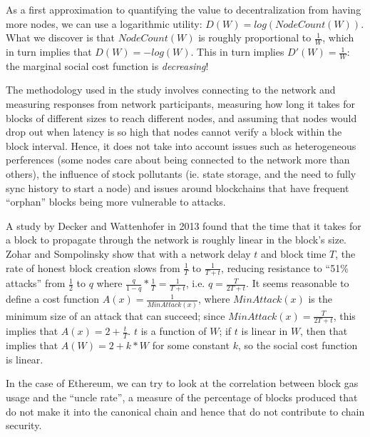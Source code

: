 \documentclass[12pt, final]{article}
\begin{document}

As a first approximation to quantifying the value to decentralization from having more nodes, we can use a logarithmic utility: $D(W) = log(NodeCount(W))$. What we discover is that $NodeCount(W)$ is roughly proportional to $\frac{1}{W}$, which in turn implies that $D(W) = -log(W)$. This in turn implies $D'(W) = \frac{1}{W}$: the marginal social cost function is \emph{decreasing}!

The methodology used in the study involves connecting to the network and measuring responses from network participants, measuring how long it takes for blocks of different sizes to reach different nodes, and assuming that nodes would drop out when latency is so high that nodes cannot verify a block within the block interval. Hence, it does not take into account issues such as heterogeneous perferences (some nodes care about being connected to the network more than others), the influence of stock pollutants (ie. state storage, and the need to fully sync history to start a node) and issues around blockchains that have frequent ``orphan'' blocks being more vulnerable to attacks.

A study by Decker and Wattenhofer in 2013 found that the time that it takes for a block to propagate through the network is roughly linear in the block's size. Zohar and Sompolinsky\cite{GHOST} show that with a network delay $t$ and block time $T$, the rate of honest block creation slows from $\frac{1}{T}$ to $\frac{1}{T+t}$, reducing resistance to ``51\% attacks'' from $\frac{1}{2}$ to $q$ where $\frac{q}{1-q} * \frac{1}{T} = \frac{1}{T+t}$, i.e. $q = \frac{T}{2T + t}$. It seems reasonable to define a cost function $A(x) = \frac{1}{MinAttack(x)}$, where $MinAttack(x)$ is the minimum size of an attack that can succeed; since $MinAttack(x) = \frac{T}{2T + t}$, this implies that $A(x) = 2 + \frac{t}{T}$. $t$ is a function of $W$; if $t$ is linear in $W$, then that implies that $A(W) = 2 + k * W$ for some constant $k$, so the social cost function is linear.

In the case of Ethereum, we can try to look at the correlation between block gas usage and the ``uncle rate'', a measure of the percentage of blocks produced that do not make it into the canonical chain and hence that do not contribute to chain security.
\end{document}
